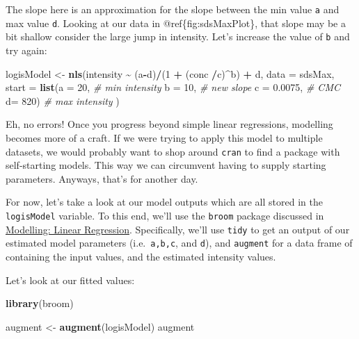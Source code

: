 \documentclass[
]{book}
\newenvironment{Shaded}{\begin{snugshade}}{\end{snugshade}}
\newcommand{\AttributeTok}[1]{\textcolor[rgb]{0.13,0.29,0.53}{#1}}
\newcommand{\CommentTok}[1]{\textcolor[rgb]{0.56,0.35,0.01}{\textit{#1}}}
\newcommand{\DecValTok}[1]{\textcolor[rgb]{0.00,0.00,0.81}{#1}}
\newcommand{\FloatTok}[1]{\textcolor[rgb]{0.00,0.00,0.81}{#1}}
\newcommand{\FunctionTok}[1]{\textcolor[rgb]{0.13,0.29,0.53}{\textbf{#1}}}
\newcommand{\NormalTok}[1]{#1}
\newcommand{\OtherTok}[1]{\textcolor[rgb]{0.56,0.35,0.01}{#1}}
\newcommand{\SpecialCharTok}[1]{\textcolor[rgb]{0.81,0.36,0.00}{\textbf{#1}}}
\begin{document}
The slope here is an approximation for the slope between the min value \texttt{a} and max value \texttt{d}. Looking at our data in @ref\{fig:sdsMaxPlot\}, that slope may be a bit shallow consider the large jump in intensity. Let's increase the value of \texttt{b} and try again:

\begin{Shaded}
\begin{Highlighting}[]
\NormalTok{logisModel }\OtherTok{\textless{}{-}} \FunctionTok{nls}\NormalTok{(intensity }\SpecialCharTok{\textasciitilde{}}\NormalTok{  (a}\SpecialCharTok{{-}}\NormalTok{d)}\SpecialCharTok{/}\NormalTok{(}\DecValTok{1} \SpecialCharTok{+}\NormalTok{ (conc }\SpecialCharTok{/}\NormalTok{c)}\SpecialCharTok{\^{}}\NormalTok{b) }\SpecialCharTok{+}\NormalTok{ d, }
                  \AttributeTok{data =}\NormalTok{ sdsMax, }
                  \AttributeTok{start =} \FunctionTok{list}\NormalTok{(}\AttributeTok{a =} \DecValTok{20}\NormalTok{,       }\CommentTok{\# min intensity}
                               \AttributeTok{b =} \DecValTok{10}\NormalTok{,       }\CommentTok{\# new slope}
                               \AttributeTok{c =} \FloatTok{0.0075}\NormalTok{,   }\CommentTok{\# CMC}
                               \AttributeTok{d=} \DecValTok{820}\NormalTok{)       }\CommentTok{\# max intensity}
\NormalTok{                  )}
\end{Highlighting}
\end{Shaded}

Eh, no errors! Once you progress beyond simple linear regressions, modelling becomes more of a craft. If we were trying to apply this model to multiple datasets, we would probably want to shop around \texttt{cran} to find a package with self-starting models. This way we can circumvent having to supply starting parameters. Anyways, that's for another day.

For now, let's take a look at our model outputs which are all stored in the \texttt{logisModel} variable. To this end, we'll use the \texttt{broom} package discussed in \protect\hyperlink{modelling-linear-regression}{Modelling: Linear Regression}. Specifically, we'll use \texttt{tidy} to get an output of our estimated model parameters (i.e.~\texttt{a,b,c}, and \texttt{d}), and \texttt{augment} for a data frame of containing the input values, and the estimated intensity values.

Let's look at our fitted values:

\begin{Shaded}
\begin{Highlighting}[]
\FunctionTok{library}\NormalTok{(broom)}

\NormalTok{augment }\OtherTok{\textless{}{-}} \FunctionTok{augment}\NormalTok{(logisModel)}
\NormalTok{augment}
\end{Highlighting}
\end{Shaded}
\end{document}
